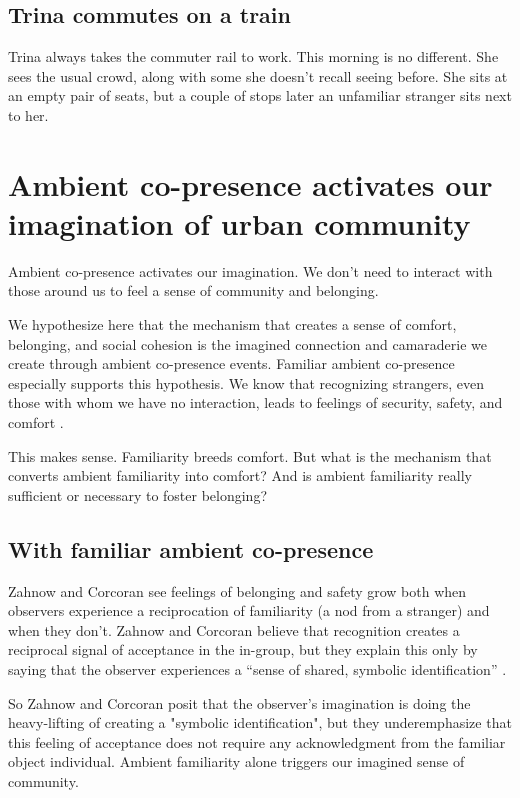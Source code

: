 \documentclass[12pt]{article}
\begin{document}
\subsection{Trina commutes on a train}
Trina always takes the commuter rail to work. This morning is no different. She sees the usual crowd, along with some she doesn't recall seeing before. She sits at an empty pair of seats, but a couple of stops later an unfamiliar stranger sits next to her.

\section{Ambient co-presence activates our imagination of urban community}

Ambient co-presence activates our imagination. We don't need to interact with those around us to feel a sense of community and belonging.

We hypothesize here that the mechanism that creates a sense of comfort, belonging, and social cohesion is the imagined connection and camaraderie we create through ambient co-presence events. Familiar ambient co-presence especially supports this hypothesis. We know that recognizing strangers, even those with whom we have no interaction, leads to feelings of security, safety, and comfort \citep{zahnow2024security}. 

This makes sense. Familiarity breeds comfort. But what is the mechanism that converts ambient familiarity into comfort? And is ambient familiarity really sufficient or necessary to foster belonging?

\subsection{With familiar ambient co-presence}

Zahnow and Corcoran see feelings of belonging and safety grow both when observers experience a reciprocation of familiarity (a nod from a stranger) and when they don't. Zahnow and Corcoran believe that recognition creates a reciprocal signal of acceptance in the in-group, but they explain this only by saying that the observer experiences a ``sense of shared, symbolic identification'' \citep{zahnow2024security}. 

So Zahnow and Corcoran posit that the observer's imagination is doing the heavy-lifting of creating a "symbolic identification", but they underemphasize that this feeling of acceptance does not require any acknowledgment from the familiar object individual. Ambient familiarity alone triggers our imagined sense of community.
\end{document}
